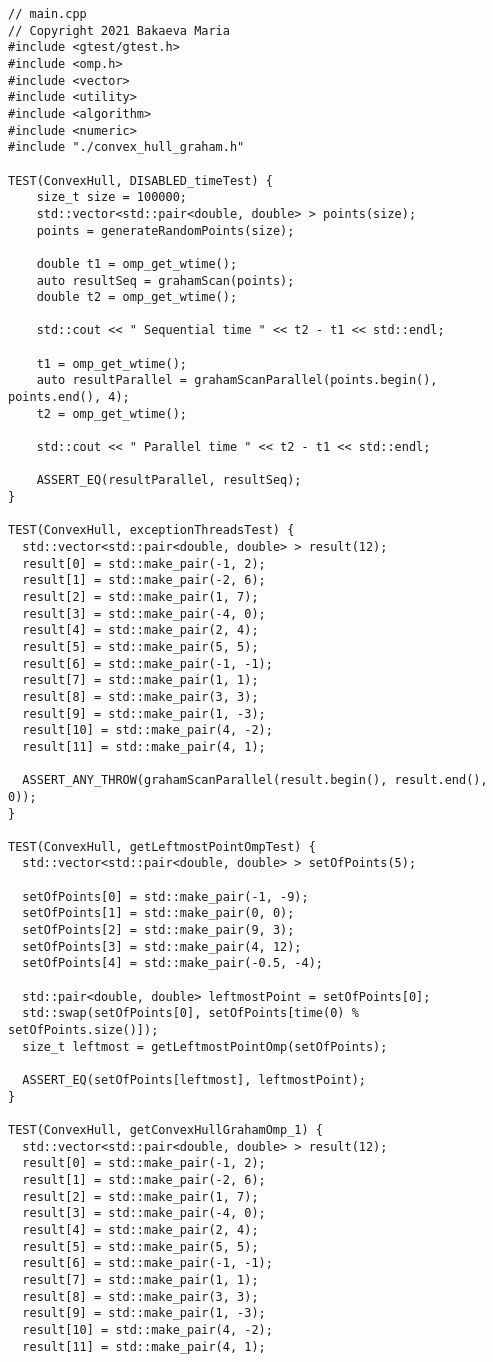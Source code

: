 \documentclass{report}
\begin{document}
\begin{lstlisting}
// main.cpp
// Copyright 2021 Bakaeva Maria
#include <gtest/gtest.h>
#include <omp.h>
#include <vector>
#include <utility>
#include <algorithm>
#include <numeric>
#include "./convex_hull_graham.h"

TEST(ConvexHull, DISABLED_timeTest) {
    size_t size = 100000;
    std::vector<std::pair<double, double> > points(size);
    points = generateRandomPoints(size);

    double t1 = omp_get_wtime();
    auto resultSeq = grahamScan(points);
    double t2 = omp_get_wtime();

    std::cout << " Sequential time " << t2 - t1 << std::endl;

    t1 = omp_get_wtime();
    auto resultParallel = grahamScanParallel(points.begin(), points.end(), 4);
    t2 = omp_get_wtime();

    std::cout << " Parallel time " << t2 - t1 << std::endl;

    ASSERT_EQ(resultParallel, resultSeq);
}

TEST(ConvexHull, exceptionThreadsTest) {
  std::vector<std::pair<double, double> > result(12);
  result[0] = std::make_pair(-1, 2);
  result[1] = std::make_pair(-2, 6);
  result[2] = std::make_pair(1, 7);
  result[3] = std::make_pair(-4, 0);
  result[4] = std::make_pair(2, 4);
  result[5] = std::make_pair(5, 5);
  result[6] = std::make_pair(-1, -1);
  result[7] = std::make_pair(1, 1);
  result[8] = std::make_pair(3, 3);
  result[9] = std::make_pair(1, -3);
  result[10] = std::make_pair(4, -2);
  result[11] = std::make_pair(4, 1);

  ASSERT_ANY_THROW(grahamScanParallel(result.begin(), result.end(), 0));
}

TEST(ConvexHull, getLeftmostPointOmpTest) {
  std::vector<std::pair<double, double> > setOfPoints(5);

  setOfPoints[0] = std::make_pair(-1, -9);
  setOfPoints[1] = std::make_pair(0, 0);
  setOfPoints[2] = std::make_pair(9, 3);
  setOfPoints[3] = std::make_pair(4, 12);
  setOfPoints[4] = std::make_pair(-0.5, -4);

  std::pair<double, double> leftmostPoint = setOfPoints[0];
  std::swap(setOfPoints[0], setOfPoints[time(0) % setOfPoints.size()]);
  size_t leftmost = getLeftmostPointOmp(setOfPoints);

  ASSERT_EQ(setOfPoints[leftmost], leftmostPoint);
}

TEST(ConvexHull, getConvexHullGrahamOmp_1) {
  std::vector<std::pair<double, double> > result(12);
  result[0] = std::make_pair(-1, 2);
  result[1] = std::make_pair(-2, 6);
  result[2] = std::make_pair(1, 7);
  result[3] = std::make_pair(-4, 0);
  result[4] = std::make_pair(2, 4);
  result[5] = std::make_pair(5, 5);
  result[6] = std::make_pair(-1, -1);
  result[7] = std::make_pair(1, 1);
  result[8] = std::make_pair(3, 3);
  result[9] = std::make_pair(1, -3);
  result[10] = std::make_pair(4, -2);
  result[11] = std::make_pair(4, 1);


\end{lstlisting}
\end{document}
